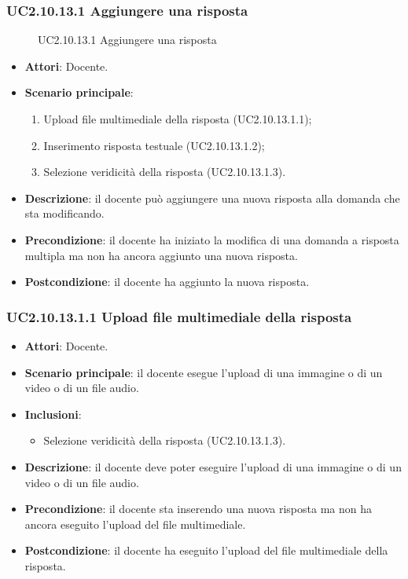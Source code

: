 \subsubsection{UC2.10.13.1 Aggiungere una risposta}
\begin{figure}[H]
\centering
\noindent{}
\caption{UC2.10.13.1 Aggiungere una risposta}
\end{figure}
\begin{itemize}
\item \textbf{Attori}: Docente.
\item \textbf{Scenario principale}:
\begin{enumerate}
\item Upload file multimediale della risposta (UC2.10.13.1.1);
\item Inserimento risposta testuale (UC2.10.13.1.2);
\item Selezione veridicità della risposta (UC2.10.13.1.3).
\end{enumerate}
\item \textbf{Descrizione}: il docente può aggiungere una nuova risposta alla domanda che sta modificando.
\item \textbf{Precondizione}: il docente ha iniziato la modifica di una domanda a risposta multipla ma non ha ancora aggiunto una nuova risposta.
\item \textbf{Postcondizione}: il docente ha aggiunto la nuova risposta.
\end{itemize}
\subsubsection{UC2.10.13.1.1 Upload file multimediale della risposta}
\begin{itemize}
\item \textbf{Attori}: Docente.
\item \textbf{Scenario principale}: il docente esegue l'upload di una immagine o di un video o di un file audio.
\item \textbf{Inclusioni}:
\begin{itemize}
\item Selezione veridicità della risposta (UC2.10.13.1.3).
\end{itemize}
\item \textbf{Descrizione}: il docente deve poter eseguire l'upload di una immagine o di un video o di un file audio.
\item \textbf{Precondizione}: il docente sta inserendo una nuova risposta  ma non ha ancora eseguito l'upload del file multimediale.
\item \textbf{Postcondizione}: il docente ha eseguito l'upload del file multimediale della risposta.
\end{itemize}
